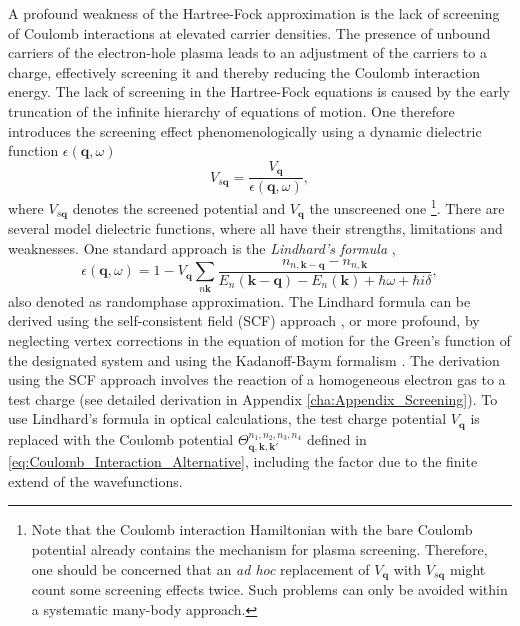 A profound weakness of the Hartree-Fock approximation is the lack
of screening of Coulomb interactions at elevated carrier densities.
The presence of unbound carriers of the electron-hole plasma leads
to an adjustment of the carriers to a charge, effectively screening
it and thereby reducing the Coulomb interaction energy. The lack of
screening in the Hartree-Fock equations is caused by the early truncation
of the infinite hierarchy of equations of motion. One therefore introduces
the screening effect phenomenologically using a dynamic dielectric
function $\epsilon(\mathbf{q},\omega)$\begin{equation}
V_{s\mathbf{q}}=\frac{V_{\mathbf{q}}}{\epsilon(\mathbf{q},\omega)},\end{equation}
where $V_{s\mathbf{q}}$ denotes the screened potential and $V_{\mathbf{q}}$
the unscreened one%
\footnote{Note that the Coulomb interaction Hamiltonian with the bare Coulomb
potential already contains the mechanism for plasma screening. Therefore,
one should be concerned that an \emph{ad hoc} replacement of $V_{\mathbf{q}}$
with $V_{s\mathbf{q}}$ might count some screening effects twice.
Such problems can only be avoided within a systematic many-body approach. %
}. There are several model dielectric functions, where all have their
strengths, limitations and weaknesses. One standard approach is the
\emph{Lindhard's formula} \citet{Chow,Haug2009},\begin{equation}
\epsilon(\mathbf{q},\omega)=1-V_{\mathbf{q}}\sum_{n\mathbf{k}}\frac{n_{n,\mathbf{k}-\mathbf{q}}-n_{n,\mathbf{k}}}{E_{n}(\mathbf{k}-\mathbf{q})-E_{n}(\mathbf{k})+\hbar\omega+\hbar i\delta},\label{eq:Full_Lindhards_Eq}\end{equation}
also denoted as randomphase approximation. The Lindhard formula can
be derived using the self-consistent field (SCF) approach \citet{Ehrenreich1959},
or more profound, by neglecting vertex corrections in the equation
of motion for the Green\textquoteright{}s function \citet{Binder1995}
of the designated system and using the Kadanoff-Baym formalism \citet{Binder1995}.
The derivation using the SCF approach involves the reaction of a homogeneous
electron gas to a test charge (see detailed derivation in Appendix
\ref{cha:Appendix_Screening}). To use Lindhard's formula in optical
calculations, the test charge potential $V_{\mathbf{q}}$ is replaced
with the Coulomb potential $\Theta_{\mathbf{q},\mathbf{k},\mathbf{k}'}^{n_{1},n_{2},n_{3},n_{4}}$
defined in \ref{eq:Coulomb_Interaction_Alternative}, including the
factor due to the finite extend of the wavefunctions.

